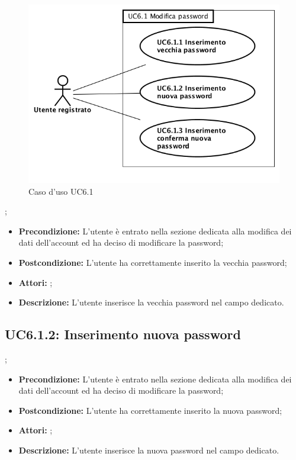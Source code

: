 \begin{figure}[h]
	\begin{center}
	\includegraphics[scale=0.4]{diagram/UC6-1.png}
	\caption{Caso d'uso UC6.1}
	\end{center}
\end{figure};
\begin{itemize}
	\item \textbf{Precondizione:} L’utente è entrato nella sezione dedicata alla modifica dei dati dell’account ed ha deciso di modificare la password;
	\item \textbf{Postcondizione:} L’utente ha correttamente inserito la vecchia password;
	\item \textbf{Attori:} ;
	\item \textbf{Descrizione:} L’utente inserisce la vecchia password nel campo dedicato.
\end{itemize}
\subsection{ UC6.1.2: Inserimento nuova password}
;
\begin{itemize}
	\item \textbf{Precondizione:} L’utente è entrato nella sezione dedicata alla modifica dei dati dell’account ed ha deciso di modificare la password;
	\item \textbf{Postcondizione:}  L’utente ha correttamente inserito la nuova password;
	\item \textbf{Attori:} ;
	\item \textbf{Descrizione:} L’utente inserisce la nuova password nel campo dedicato.
\end{itemize}
